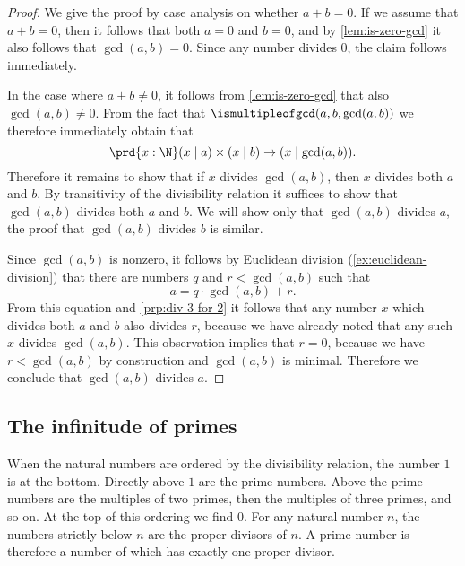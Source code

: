 \begin{proof}
  We give the proof by case analysis on whether $a+b=0$.
  If we assume that $a+b=0$, then it follows that both $a=0$ and $b=0$, and by \cref{lem:is-zero-gcd} it also follows that $\gcd(a,b)=0$. Since any number divides $0$, the claim follows immediately.

  In the case where $a+b\neq 0$, it follows from \cref{lem:is-zero-gcd} that also $\gcd(a,b)\neq 0$. From the fact that $\ismultipleofgcd(a,b,\gcd(a,b))$ we therefore immediately obtain that
  \begin{equation*}
    \prd{x:\N} (x\mid a)\times (x\mid b)\to (x\mid \gcd(a,b)).
  \end{equation*}
  Therefore it remains to show that if $x$ divides $\gcd(a,b)$, then $x$ divides both $a$ and $b$. By transitivity of the divisibility relation it suffices to show that $\gcd(a,b)$ divides both $a$ and $b$. We will show only that $\gcd(a,b)$ divides $a$, the proof that $\gcd(a,b)$ divides $b$ is similar.

  Since $\gcd(a,b)$ is nonzero, it follows by Euclidean division (\cref{ex:euclidean-division}) that there are numbers $q$ and $r<\gcd(a,b)$ such that
  \begin{equation*}
    a = q\cdot\gcd(a,b)+r.
  \end{equation*}
  From this equation and \cref{prp:div-3-for-2} it follows that any number $x$ which divides both $a$ and $b$ also divides $r$, because we have already noted that any such $x$ divides $\gcd(a,b)$. This observation implies that $r=0$, because we have $r<\gcd(a,b)$ by construction and $\gcd(a,b)$ is minimal. Therefore we conclude that $\gcd(a,b)$ divides $a$.
\end{proof}

\subsection{The infinitude of primes}

When the natural numbers are ordered by the divisibility relation, the number $1$ is at the bottom. Directly above $1$ are the prime numbers. Above the prime numbers are the multiples of two primes, then the multiples of three primes, and so on. At the top of this ordering we find $0$. For any natural number $n$, the numbers strictly below $n$ are the proper divisors of $n$. A prime number is therefore a number of which has exactly one proper divisor.

